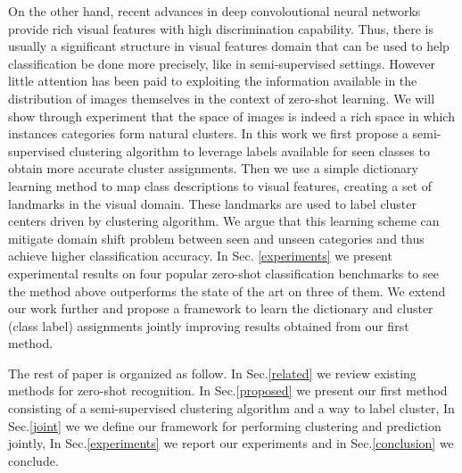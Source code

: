 \documentclass[10pt,twocolumn,letterpaper]{article}
\begin{document}
 On the other hand, recent advances in deep convoloutional neural networks provide rich visual features with high discrimination capability.
 Thus, there is usually a significant structure in visual features domain
that can be used to help classification be done more precisely, like in semi-supervised settings. However little attention
has been paid to exploiting the information available in the distribution of images themselves in the context of zero-shot learning. We will show through experiment that
the space of images is indeed a rich space in which instances categories form natural clusters.
 In this work
 we first propose a
  semi-supervised clustering algorithm to leverage labels available for seen classes to obtain more accurate cluster assignments.
 Then we use a simple dictionary learning method to map class descriptions to visual features, creating a set of landmarks in the visual domain.
 These landmarks are used to label cluster centers driven by clustering algorithm.
  We argue that this learning scheme can mitigate domain shift problem \cite{eccv14} between seen and unseen categories and thus achieve higher classification accuracy.
In Sec. \ref{experiments} we present experimental results on four popular zero-shot classification benchmarks to see
the method above outperforms the state of the art on three of them.
 We extend our work further and propose a framework to learn the dictionary and cluster (class label) assignments jointly
 improving results obtained from our first method.

The rest of paper is organized as follow. In Sec.\ref{related} we review existing methods for zero-shot recognition.
In Sec.\ref{proposed} we present our first method consisting of a semi-supervised clustering algorithm and a way to label cluster, In Sec.\ref{joint} we
we define our framework for performing clustering and prediction jointly, In Sec.\ref{experiments} we report our experiments and in Sec.\ref{conclusion}
we conclude.

\end{document}
